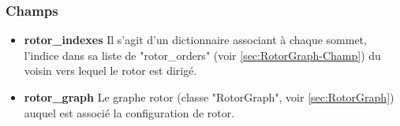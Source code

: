 \documentclass{article}
\begin{document}
			\subsubsection{Champs}
				\begin{itemize}	
					\item \textbf{rotor\_indexes}\newline
					Il s'agit d'un dictionnaire associant à chaque sommet, l'indice dans sa liste de "rotor\_orders" (voir \ref{sec:RotorGraph-Champ}) du voisin vers lequel le rotor est dirigé.
					\item \textbf{rotor\_graph}\newline
					Le graphe rotor (classe "RotorGraph", voir \ref{sec:RotorGraph}) auquel est associé la configuration de rotor.
				\end{itemize}
            
\end{document}
